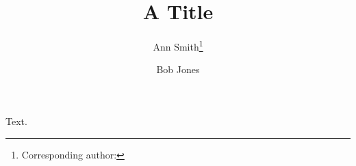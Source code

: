 \documentclass{llncs}
\begin{document}
\title{A Title}
\author{Ann Smith\thanks{Corresponding author: } \and Bob Jones}
\maketitle
Text.
\end{document}
